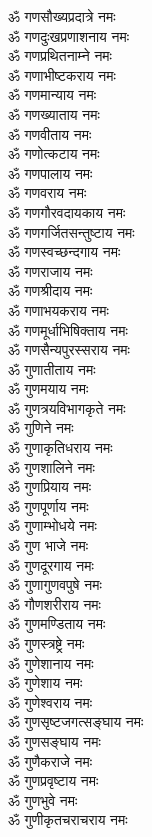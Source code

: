 \begin{multicols}{2}
\begin{flushleft}
ॐ गणसौख्यप्रदात्रे नमः\\
ॐ गणदुःखप्रणाशनाय नमः\\
ॐ गणप्रथितनाम्ने नमः\\
ॐ गणाभीष्टकराय नमः\\
ॐ गणमान्याय नमः\\
ॐ गणख्याताय नमः\\
ॐ गणवीताय नमः\hfill{}\\
ॐ गणोत्कटाय नमः\\
ॐ गणपालाय नमः\\
ॐ गणवराय नमः\\
ॐ गणगौरवदायकाय नमः\\
ॐ गणगर्जितसन्तुष्टाय नमः\\
ॐ गणस्वच्छन्दगाय नमः\\
ॐ गणराजाय नमः\\
ॐ गणश्रीदाय नमः\\
ॐ गणाभयकराय नमः\\
ॐ गणमूर्धाभिषिक्ताय नमः\hfill{}\\
ॐ गणसैन्यपुरस्सराय नमः\\
ॐ गुणातीताय नमः\\
ॐ गुणमयाय नमः\\
ॐ गुणत्रयविभागकृते नमः\\
ॐ गुणिने नमः\\
ॐ गुणाकृतिधराय नमः\\
ॐ गुणशालिने नमः\\
ॐ गुणप्रियाय नमः\\
ॐ गुणपूर्णाय नमः\\
ॐ गुणाम्भोधये नमः\hfill{}\\
ॐ गुण भाजे नमः\\
ॐ गुणदूरगाय नमः\\
ॐ गुणागुणवपुषे नमः\\
ॐ गौणशरीराय नमः\\
ॐ गुणमण्डिताय नमः\\
ॐ गुणस्त्रष्ट्रे नमः\\
ॐ गुणेशानाय नमः\\
ॐ गुणेशाय नमः\\
ॐ गुणेश्वराय नमः\\
ॐ गुणसृष्टजगत्सङ्घाय नमः\hfill{}\\
ॐ गुणसङ्घाय नमः\\
ॐ गुणैकराजे नमः\\
ॐ गुणप्रवृष्टाय नमः\\
ॐ गुणभुवे नमः\\
ॐ गुणीकृतचराचराय नमः\\

\end{flushleft}
\end{multicols}

